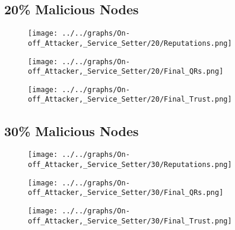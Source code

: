 \begin{minipage}[t]{0.49\columnwidth}
\subsection*{20\% Malicious Nodes}
    \begin{figure}[H]
        \centering
        \texttt{[image: ../../graphs/On-off\_Attacker,\_Service\_Setter/20/Reputations.png]}
    \end{figure}
    \begin{figure}[H]
        \centering
        \texttt{[image: ../../graphs/On-off\_Attacker,\_Service\_Setter/20/Final\_QRs.png]}
    \end{figure}
\end{minipage}
\begin{minipage}[t]{0.49\columnwidth}
    \begin{figure}[H]
        \centering
        \texttt{[image: ../../graphs/On-off\_Attacker,\_Service\_Setter/20/Final\_Trust.png]}
    \end{figure}
\end{minipage}

\begin{minipage}[t]{0.49\columnwidth}
\subsection*{30\% Malicious Nodes}
    \begin{figure}[H]
        \centering
        \texttt{[image: ../../graphs/On-off\_Attacker,\_Service\_Setter/30/Reputations.png]}
    \end{figure}
    \begin{figure}[H]
        \centering
        \texttt{[image: ../../graphs/On-off\_Attacker,\_Service\_Setter/30/Final\_QRs.png]}
    \end{figure}
\end{minipage}
\begin{minipage}[t]{0.49\columnwidth}
    \begin{figure}[H]
        \centering
        \texttt{[image: ../../graphs/On-off\_Attacker,\_Service\_Setter/30/Final\_Trust.png]}
    \end{figure}
\end{minipage}

